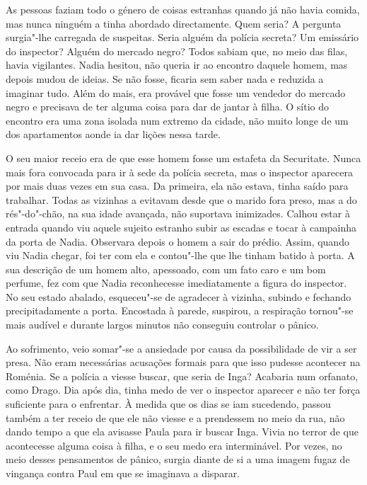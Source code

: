 As pessoas faziam todo o género de coisas estranhas quando já não havia
comida, mas nunca ninguém a tinha abordado directamente. Quem seria? A
pergunta surgia"-lhe carregada de suspeitas. Seria alguém da polícia secreta? Um
emissário do inspector? Alguém do mercado
negro? Todos sabiam que, no meio das filas, havia vigilantes. Nadia
hesitou, não queria ir ao encontro daquele homem, mas depois mudou de
ideias. Se não fosse, ficaria sem saber nada e reduzida a imaginar tudo.
Além do mais, era provável que fosse um vendedor do mercado negro e
precisava de ter alguma coisa para dar de jantar à filha. O sítio do
encontro era uma zona isolada num extremo da cidade, não muito longe de
um dos apartamentos aonde ia dar lições nessa tarde.

O seu maior receio era de que esse homem fosse um estafeta da
Securitate. Nunca mais fora convocada para ir à sede da polícia secreta,
mas o inspector aparecera por mais duas vezes em sua casa. Da primeira,
ela não estava, tinha saído para trabalhar. Todas as vizinhas a evitavam
desde que o marido fora preso, mas a do rés"-do"-chão, na sua idade
avançada, não suportava inimizades. Calhou estar à entrada quando viu
aquele sujeito estranho subir as escadas e tocar à campainha da porta de
Nadia. Observara depois o homem a sair do prédio. Assim, quando viu
Nadia chegar, foi ter com ela e contou"-lhe que lhe tinham batido à
porta. A sua descrição de um homem alto, apessoado, com um fato caro e
um bom perfume, fez com que Nadia reconhecesse imediatamente a figura do
inspector. No seu estado abalado, esqueceu"-se de agradecer à vizinha,
subindo e fechando precipitadamente a porta. Encostada à parede,
suspirou, a respiração tornou"-se mais audível e durante largos minutos
não conseguiu controlar o pânico.

Ao sofrimento, veio somar"-se a
ansiedade por causa da possibilidade de vir a ser presa. Não eram
necessárias acusações formais para que isso pudesse acontecer na
Roménia. Se a polícia a viesse buscar, que seria de Inga? Acabaria num
orfanato, como Drago. Dia após dia, tinha medo de ver o inspector
aparecer e não ter força suficiente para o enfrentar. À medida que os
dias se iam sucedendo, passou também a ter receio de que ele não viesse
e a prendessem no meio da rua, não dando tempo a que ela avisasse
Paula para ir buscar Inga. Vivia no terror de que acontecesse alguma
coisa à filha, e o seu medo era interminável. Por vezes, no meio
desses pensamentos de pânico, surgia diante de si a uma imagem fugaz de
vingança contra Paul em que se imaginava a disparar.

